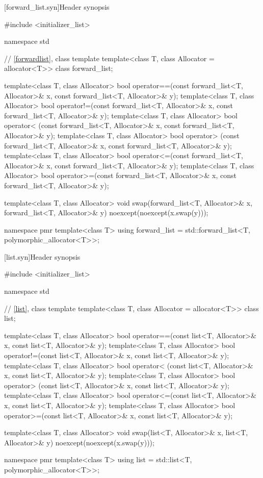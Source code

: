 [forward_list.syn]{Header  synopsis}

%

\begin{codeblock}
#include <initializer_list>

namespace std {
  // \ref{forwardlist}, class template 
  template<class T, class Allocator = allocator<T>> class forward_list;

  template<class T, class Allocator>
    bool operator==(const forward_list<T, Allocator>& x, const forward_list<T, Allocator>& y);
  template<class T, class Allocator>
    bool operator!=(const forward_list<T, Allocator>& x, const forward_list<T, Allocator>& y);
  template<class T, class Allocator>
    bool operator< (const forward_list<T, Allocator>& x, const forward_list<T, Allocator>& y);
  template<class T, class Allocator>
    bool operator> (const forward_list<T, Allocator>& x, const forward_list<T, Allocator>& y);
  template<class T, class Allocator>
    bool operator<=(const forward_list<T, Allocator>& x, const forward_list<T, Allocator>& y);
  template<class T, class Allocator>
    bool operator>=(const forward_list<T, Allocator>& x, const forward_list<T, Allocator>& y);

  template<class T, class Allocator>
    void swap(forward_list<T, Allocator>& x, forward_list<T, Allocator>& y)
      noexcept(noexcept(x.swap(y)));

  namespace pmr {
    template<class T>
      using forward_list = std::forward_list<T, polymorphic_allocator<T>>;
  }
}
\end{codeblock}

[list.syn]{Header  synopsis}

%

\begin{codeblock}
#include <initializer_list>

namespace std {
  // \ref{list}, class template 
  template<class T, class Allocator = allocator<T>> class list;

  template<class T, class Allocator>
    bool operator==(const list<T, Allocator>& x, const list<T, Allocator>& y);
  template<class T, class Allocator>
    bool operator!=(const list<T, Allocator>& x, const list<T, Allocator>& y);
  template<class T, class Allocator>
    bool operator< (const list<T, Allocator>& x, const list<T, Allocator>& y);
  template<class T, class Allocator>
    bool operator> (const list<T, Allocator>& x, const list<T, Allocator>& y);
  template<class T, class Allocator>
    bool operator<=(const list<T, Allocator>& x, const list<T, Allocator>& y);
  template<class T, class Allocator>
    bool operator>=(const list<T, Allocator>& x, const list<T, Allocator>& y);

  template<class T, class Allocator>
    void swap(list<T, Allocator>& x, list<T, Allocator>& y)
      noexcept(noexcept(x.swap(y)));

  namespace pmr {
    template<class T>
      using list = std::list<T, polymorphic_allocator<T>>;
  }
}
\end{codeblock}

